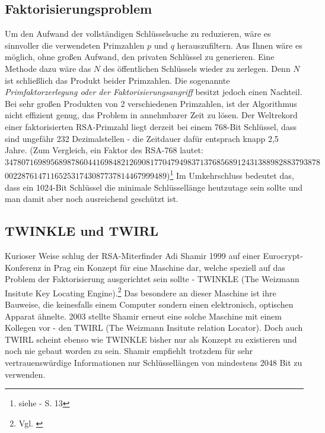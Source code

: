 \subsection{Faktorisierungsproblem}
Um den Aufwand der vollständigen Schlüsselsuche zu reduzieren, wäre es
sinnvoller die verwendeten Primzahlen $p$ und $q$ herauszufiltern. Aus Ihnen
wäre es möglich, ohne großen Aufwand, den privaten Schlüssel zu generieren. Eine
Methode dazu wäre das $N$ des öffentlichen Schlüssels wieder zu zerlegen. Denn
$N$ ist schließlich das Produkt beider Primzahlen.
Die sogenannte \emph{Primfaktorzerlegung oder der Faktorisierungsangriff}
besitzt jedoch einen Nachteil. Bei sehr großen Produkten von 2 verschiedenen
Primzahlen, ist der Algorithmus nicht effizient genug, das Problem in
annehmbarer Zeit zu lösen.
Der Weltrekord einer faktorisierten RSA-Primzahl liegt derzeit bei einem 768-Bit
Schlüssel, dass sind ungefähr 232 Dezimalstellen - die Zeitdauer dafür
entsprach knapp 2,5 Jahre.
(Zum Vergleich, ein Faktor des RSA-768 lautet: \newline 
$347807169895689878604416984821269081770479498371376856891
2431388982883793878$\newline$002287614711652531743087737814467999489$)\footnote{siehe
\citet{768RSA} - S. 13}
Im Umkehrschluss bedeutet das, dass ein 1024-Bit Schlüssel die minimale
Schlüssellänge heutzutage sein sollte und man damit aber noch ausreichend
geschützt ist.
\subsection{TWINKLE und TWIRL}
Kurioser Weise schlug der RSA-Miterfinder Adi Shamir 1999 auf einer
Eurocrypt-Konferenz in Prag ein Konzept für eine Maschine dar, welche speziell
auf das Problem der Faktorisierung ausgerichtet sein sollte -
TWINKLE (The Weizmann Insitute Key Locating Engine).\footnote{Vgl.
\citet{TWINKLE}} Das besondere an dieser Maschine ist ihre Bauweise, die
keinesfalls einem Computer sondern einen elektronisch, optischen Apparat
ähnelte.
2003 stellte Shamir erneut eine solche Maschine mit einem Kollegen vor - den
TWIRL (The Weizmann Insitute relation Locator). Doch auch TWIRL scheint ebenso
wie TWINKLE bisher nur als Konzept zu existieren und noch nie gebaut worden zu
sein. Shamir empfiehlt trotzdem für sehr vertrauenswürdige Informationen nur
Schlüssellängen von mindestens 2048 Bit zu verwenden.

